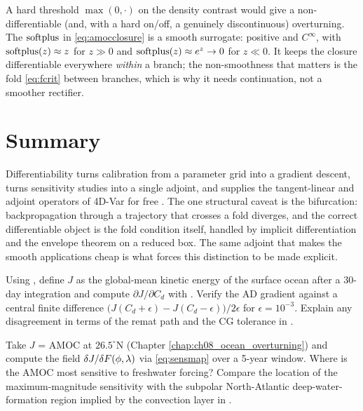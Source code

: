 \begin{remark}
A hard threshold $\max(0,\cdot)$ on the density contrast would give a
non-differentiable (and, with a hard on/off, a genuinely discontinuous)
overturning. The $\operatorname{softplus}$ in \eqref{eq:amocclosure} is a smooth surrogate:
positive and $C^\infty$, with $\operatorname{softplus}(z)\approx z$ for $z\gg0$ and
$\operatorname{softplus}(z)\approx e^{z}\to 0$ for $z\ll0$. It keeps the closure
differentiable everywhere \emph{within} a branch; the non-smoothness that matters
is the fold \eqref{eq:fcrit} between branches, which is why it needs continuation,
not a smoother rectifier.
\end{remark}

\section*{Summary}

Differentiability turns calibration from a parameter grid into a gradient
descent, turns sensitivity studies into a single adjoint, and supplies the
tangent-linear and adjoint operators of 4D-Var for free
\citep{jax2018,kochkov2024neuralgcm}. The one structural caveat is the
bifurcation: backpropagation through a trajectory that crosses a fold diverges,
and the correct differentiable object is the fold condition itself, handled by
implicit differentiation and the envelope theorem on a reduced box. The same
adjoint that makes the smooth applications cheap is what forces this distinction
to be made explicit.

\begin{exercise}
Using , define $J$ as the global-mean kinetic energy
of the surface ocean after a 30-day integration and compute
$\partial J/\partial C_d$ with . Verify the AD gradient against a
central finite difference $\big(J(C_d{+}\epsilon)-J(C_d{-}\epsilon)\big)/2\epsilon$
for $\epsilon=10^{-3}$. Explain any disagreement in terms of the remat path and
the CG tolerance in .
\end{exercise}

\begin{exercise}
Take $J$ = AMOC at $26.5^\circ$N (Chapter \ref{chap:ch08_ocean_overturning}) and
compute the field $\delta J/\delta F(\phi,\lambda)$ via \eqref{eq:sensmap} over a
5-year window. Where is the AMOC most sensitive to freshwater forcing? Compare
the location of the maximum-magnitude sensitivity with the subpolar
North-Atlantic deep-water-formation region implied by the convection layer in
.
\end{exercise}

